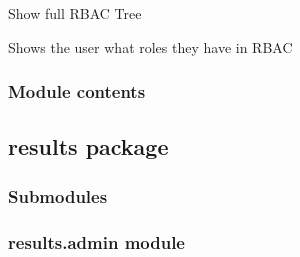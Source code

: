 \documentclass[letterpaper,10pt,english]{sphinxmanual}
\begin{document}

\begin{fulllineitems}
\label{\detokenize{rbac:rbac.views.tree_screen}}
Show full RBAC Tree

\end{fulllineitems}


\begin{fulllineitems}
\label{\detokenize{rbac:rbac.views.view_screen}}
Shows the user what roles they have in RBAC

\end{fulllineitems}



\subsubsection{Module contents}
\label{\detokenize{rbac:module-rbac}}\label{\detokenize{rbac:module-contents}}

\subsection{results package}
\label{\detokenize{results:results-package}}\label{\detokenize{results::doc}}

\subsubsection{Submodules}
\label{\detokenize{results:submodules}}

\subsubsection{results.admin module}
\label{\detokenize{results:module-results.admin}}\label{\detokenize{results:results-admin-module}}
\end{document}
